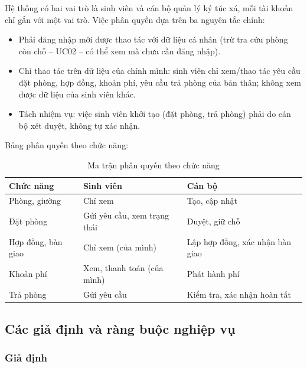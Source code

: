 Hệ thống có hai vai trò là sinh viên và cán bộ quản lý ký túc xá, mỗi tài khoản chỉ gắn với một vai trò. Việc phân quyền dựa trên ba nguyên tắc chính:

\begin{itemize}[leftmargin=1.4em]
\item Phải đăng nhập mới được thao tác với dữ liệu cá nhân (trừ tra cứu phòng còn chỗ – UC02 – có thể xem mà chưa cần đăng nhập).
\item Chỉ thao tác trên dữ liệu của chính mình: sinh viên chỉ xem/thao tác yêu cầu đặt phòng, hợp đồng, khoản phí, yêu cầu trả phòng của bản thân; không xem được dữ liệu của sinh viên khác.
\item Tách nhiệm vụ: việc sinh viên khởi tạo (đặt phòng, trả phòng) phải do cán bộ xét duyệt, không tự xác nhận.
\end{itemize}

Bảng phân quyền theo chức năng:

\begin{table}[H]
\centering
\small
\caption{Ma trận phân quyền theo chức năng}
\label{tab:ch2-2}
\begin{tabularx}{\textwidth}{|>{\raggedright\arraybackslash}p{}|>{\raggedright\arraybackslash}X|>{\raggedright\arraybackslash}p{}|}
\hline
\textbf{Chức năng} & \textbf{Sinh viên} & \textbf{Cán bộ} \\
\hline
Phòng, giường & Chỉ xem & Tạo, cập nhật \\
\hline
Đặt phòng & Gửi yêu cầu, xem trạng thái & Duyệt, giữ chỗ \\
\hline
Hợp đồng, bàn giao & Chỉ xem (của mình) & Lập hợp đồng, xác nhận bàn giao \\
\hline
Khoản phí & Xem, thanh toán (của mình) & Phát hành phí \\
\hline
Trả phòng & Gửi yêu cầu & Kiểm tra, xác nhận hoàn tất \\
\hline
\end{tabularx}
\end{table}

\subsection{Các giả định và ràng buộc nghiệp vụ}

\subsubsection{Giả định}

